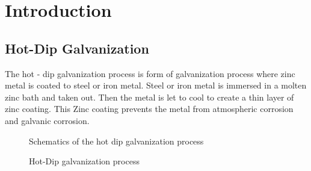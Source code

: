 \documentclass[main.tex]{subfiles}
\begin{document}
\chapter{Introduction}
\section{Hot-Dip Galvanization} 
The hot - dip galvanization process is form of galvanization process where zinc metal is coated to steel or iron metal. Steel or iron metal is immersed in a molten zinc bath and taken out. Then the metal is let to cool to create a thin layer of zinc coating. This Zinc coating prevents the metal from atmospheric corrosion and galvanic corrosion. 

\begin{figure}[h!]
\centering


\caption{Schematics of the hot dip galvanization process}
\label{fig:hotdip_sch}
\end{figure}


\begin{figure}[h!]
\centering


\caption{Hot-Dip galvanization process}
\label{fig:hotdip}
\end{figure}
\end{document}
